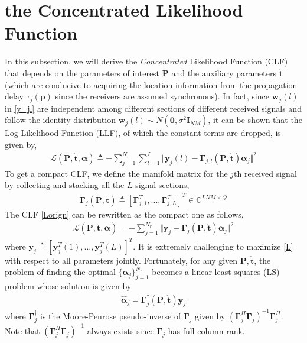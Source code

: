 \documentclass[review]{elsarticle}
\begin{document}
\section{the Concentrated Likelihood Function}
In this subsection, we will derive the \emph{Concentrated} Likelihood Function (CLF) that depends on the parameters of interest $\boldsymbol{P}$ and the auxiliary parameters $\mathring{\boldsymbol{t}}$ (which are conducive to acquiring the location information from the propagation delay $\tau_j(\boldsymbol{p})$ since the receivers are assumed synchronous). In fact, since $\boldsymbol{w}_j(l)$ in \eqref{y_jl} are independent among different sections of different received signals and follow the identity distribution $\boldsymbol{w}_j(l)\sim N(\boldsymbol{0},\sigma^2\boldsymbol{I}_{NM})$, it can be shown that the Log Likelihood Function (LLF), of which the constant terms are dropped, is given by,
\begin{align}\label{Lorign}
\mathcal{L}(\boldsymbol{P},\mathring{\boldsymbol{t}},\boldsymbol{\alpha})\triangleq-\sum_{j=1}^{N_r}\sum_{l=1}^L\Vert \boldsymbol{y}_j(l)-\boldsymbol{\Gamma}_{j,l}(\boldsymbol{P},\mathring{\boldsymbol{t}})\boldsymbol{\alpha}_j\Vert^2
\end{align}
To get a compact CLF, we define the manifold matrix for the $j$th received signal by collecting and stacking all the $L$ signal sections,
\begin{align}\label{Gammaj}
    \boldsymbol{\Gamma}_{j}(\boldsymbol{P},\mathring{\boldsymbol{t}})\triangleq[\boldsymbol{\Gamma}_{j,1}^T,...,\boldsymbol{\Gamma}_{j,L}^T]^T\in \mathbb{C}^{LNM\times Q}
\end{align}
The CLF \eqref{Lorign} can be rewritten as the compact one as follows,
\begin{align}\label{L}
    \mathcal{L}(\boldsymbol{P},\mathring{\boldsymbol{t}},\boldsymbol{\alpha})=-\sum_{j=1}^{N_r}\Vert \boldsymbol{y}_j-\boldsymbol{\Gamma}_{j}(\boldsymbol{P},\mathring{\boldsymbol{t}})\boldsymbol{\alpha}_j\Vert^2
\end{align}
where $\boldsymbol{y}_j\triangleq[\boldsymbol{y}_j^T(1),...,\boldsymbol{y}_j^T(L)]^T$. It is extremely challenging to maximize \eqref{L} with respect to all parameters jointly. Fortunately, for any given $\boldsymbol{P},\mathring{\boldsymbol{t}}$, the problem of finding the optimal $\lbrace \boldsymbol{\alpha}_j\rbrace _{j=1}^{N_r}$ becomes a linear least squares (LS) problem \cite{Golub1973The} whose solution is given by
\begin{align}
    \hat{\boldsymbol{\alpha}}_j=\boldsymbol{\Gamma}_{j}^\dagger(\boldsymbol{P},\mathring{\boldsymbol{t}})\boldsymbol{y}_j
\end{align}
where $\boldsymbol{\Gamma}_{j}^\dagger$ is the Moore-Penrose pseudo-inverse of $\boldsymbol{\Gamma}_{j}$ given by $(\boldsymbol{\Gamma}_{j}^H\boldsymbol{\Gamma}_{j})^{-1}\boldsymbol{\Gamma}_{j}^H$. Note that $(\boldsymbol{\Gamma}_{j}^H\boldsymbol{\Gamma}_{j})^{-1}$ always exists since $\boldsymbol{\Gamma}_{j}$ has full column rank. 
\end{document}
